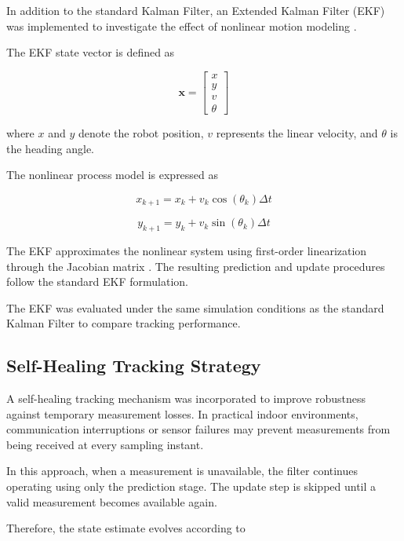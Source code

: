 \documentclass[conference]{IEEEtran}
\begin{document}
In addition to the standard Kalman Filter, an Extended Kalman Filter (EKF) was implemented to investigate the effect of nonlinear motion modeling \cite{ekf}.

The EKF state vector is defined as

\begin{equation}
\mathbf{x}
=
\begin{bmatrix}
x\\
y\\
v\\
\theta
\end{bmatrix}
\end{equation}

where $x$ and $y$ denote the robot position, $v$ represents the linear velocity, and $\theta$ is the heading angle.

The nonlinear process model is expressed as

\begin{equation}
x_{k+1}
=
x_k
+
v_k \cos(\theta_k)\Delta t
\end{equation}

\begin{equation}
y_{k+1}
=
y_k
+
v_k \sin(\theta_k)\Delta t
\end{equation}

The EKF approximates the nonlinear system using first-order linearization through the Jacobian matrix \cite{ekf}. The resulting prediction and update procedures follow the standard EKF formulation.

The EKF was evaluated under the same simulation conditions as the standard Kalman Filter to compare tracking performance.

\subsection{Self-Healing Tracking Strategy}

A self-healing tracking mechanism was incorporated to improve robustness against temporary measurement losses. In practical indoor environments, communication interruptions or sensor failures may prevent measurements from being received at every sampling instant.

In this approach, when a measurement is unavailable, the filter continues operating using only the prediction stage. The update step is skipped until a valid measurement becomes available again.

Therefore, the state estimate evolves according to
\end{document}
